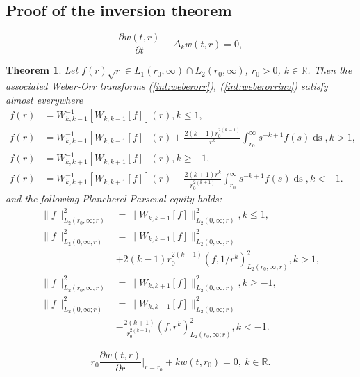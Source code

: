 \documentclass[10pt,a4paper]{amsart}
\newtheorem{thm}{Theorem}
\newcommand{\RM}{\mathbb{R}}
\newcommand{\ds}{\operatorname{ds}}
\begin{document}
\subsection{Proof of the inversion theorem} \label{wkk:proof}

\begin{equation} \label{wkk1:omegaeqpolar}
\frac{\partial w(t,r)}{\partial t} - \Delta_k w(t,r) = 0,
\end{equation}

\begin{thm}\label{wkk1:thm}Let $f(r) \sqrt r \in L_1(r_0,\infty)\cap L_2(r_0,\infty)$, $r_0>0$, $k \in \RM$. Then the associated Weber-Orr transforms (\ref{int:weberorr}), (\ref{int:weberorrinv}) satisfy  almost everywhere 
\begin{align*}
f(r) &= W^{-1}_{k,k-1}\left [W_{k,k-1} [f] \right ](r), k\leq 1, \\
f(r) &= W^{-1}_{k,k-1}\left [W_{k,k-1} [f] \right ](r) +  \frac {2(k-1) r_0^{2(k-1)}} {r^k} \int_{r_0}^\infty s^{-k+1} f(s) \ds,k>1,\\
f(r) &= W^{-1}_{k,k+1}\left [W_{k,k+1} [f] \right ](r), k\geq -1, \\
f(r) &= W^{-1}_{k,k+1}\left [W_{k,k+1} [f] \right ](r) -  \frac {2(k+1) r^{k}} {r_0^{2(k+1)}} \int_{r_0}^\infty s^{-k+1} f(s) \ds,k<-1.
\end{align*}
and the following Plancherel-Parseval equity holds:
\begin{align*}
\|f\|_{L_2(r_0,\infty; r)}^2 &= \| W_{k,k-1}[f] \|_{L_2(0,\infty; r) }^2 , k\leq 1, \\
\|f\|_{L_2(0,\infty; r) }^2 &= \| W_{k,k-1}[f] \|_{L_2(0,\infty; r) } ^2 \\
&+ {2(k-1)} r_0^{2(k-1)} \left (f,1/r^k \right )^2_{L_2(r_0,\infty; r)}, k> 1,\\
\|f\|_{L_2(r_0,\infty; r)}^2 &= \| W_{k,k+1}[f] \|_{L_2(0,\infty; r) }^2 , k\geq -1, \\
\|f\|_{L_2(0,\infty; r) }^2 &= \| W_{k,k-1}[f] \|_{L_2(0,\infty; r) } ^2 \\
&- \frac{2(k+1)}{r_0^{2(k+1)}} \left (f,r^k \right )^2_{L_2(r_0,\infty; r)}, k< -1.
\end{align*}
\end{thm}

\begin{equation}\label{wkk1:robin_bound1}
r_0\frac{\partial w(t,r)}{\partial r}\Big|_{r=r_0} + k w(t,r_0) = 0,~k \in \RM.
\end{equation}
\end{document}
